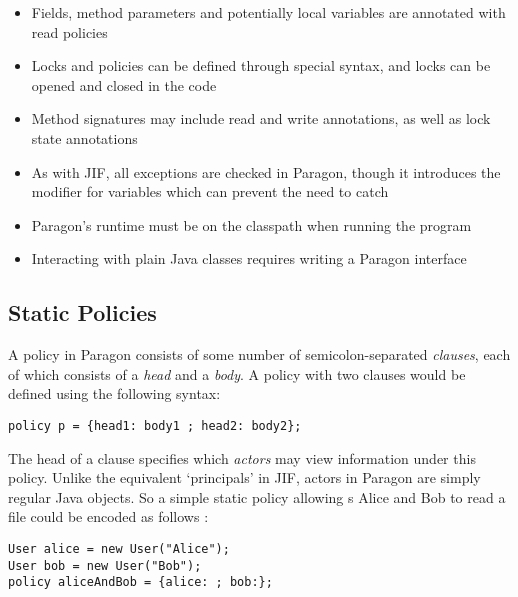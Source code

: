 \begin{itemize}
	
	\item Fields, method parameters and potentially local variables are annotated with read policies
	
	\item Locks and policies can be defined through special syntax, and locks can be opened and closed in the code
	
	\item Method signatures may include read and write annotations, as well as lock state annotations
	
	\item As with JIF, all exceptions are checked in Paragon, though it introduces the  modifier for variables which can prevent the need to catch 
	
	\item Paragon's runtime must be on the classpath when running the program
	
	\item Interacting with plain Java classes requires writing a Paragon interface
	
\end{itemize}

\subsection{Static Policies}

A policy in Paragon consists of some number of semicolon-separated \textit{clauses}, each of which consists of a \textit{head} and a \textit{body}. A policy  with two clauses would be defined using the following syntax:

\begin{verbatim}
policy p = {head1: body1 ; head2: body2};
\end{verbatim}

The head of a clause specifies which \textit{actors} may view information under this policy. Unlike the equivalent `principals' in JIF, actors in Paragon are simply regular Java objects. So a simple static policy allowing s Alice and Bob to read a file could be encoded as follows \cite{broberg2013paragon}:

\begin{verbatim}
User alice = new User("Alice");
User bob = new User("Bob");
policy aliceAndBob = {alice: ; bob:};
\end{verbatim}

